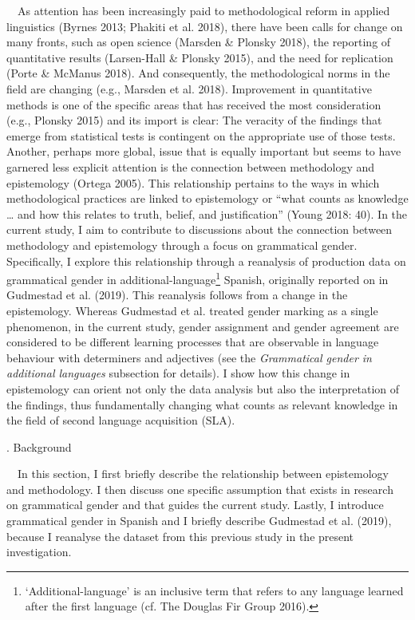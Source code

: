 \documentclass[12pt]{article}
\newenvironment{styleNoSpacing}{\setlength\leftskip{0cm}\setlength\rightskip{0cm plus 1fil}\setlength\parindent{0cm}\setlength\parfillskip{0pt plus 1fil}\setlength\parskip{0cm plus 1pt}\writerlistparindent\writerlistleftskip\leavevmode\normalfont\normalsize\fontsize{11pt}{13.2pt}\selectfont\writerlistlabel\ignorespaces}{\unskip\vspace{0cm plus 1pt}\par}
\newcommand\writerlistleftskip{}
\newcommand\writerlistparindent{}
\newcommand\writerlistlabel{}
\begin{document}
\begin{styleNoSpacing}
\ \ As attention has been increasingly paid to methodological reform in applied linguistics (Byrnes 2013; Phakiti et al. 2018), there have been calls for change on many fronts, such as open science (Marsden \& Plonsky 2018), the reporting of quantitative results (Larsen-Hall \& Plonsky 2015), and the need for replication (Porte \& McManus 2018). And consequently, the methodological norms in the field are changing (e.g., Marsden et al. 2018). Improvement in quantitative methods is one of the specific areas that has received the most consideration (e.g., Plonsky 2015) and its import is clear: The veracity of the findings that emerge from statistical tests is contingent on the appropriate use of those tests. Another, perhaps more global, issue that is equally important but seems to have garnered less explicit attention is the connection between methodology and epistemology (Ortega 2005). This relationship pertains to the ways in which methodological practices are linked to epistemology or “what counts as knowledge … and how this relates to truth, belief, and justification” (Young 2018: 40). In the current study, I aim to contribute to discussions about the connection between methodology and epistemology through a focus on grammatical gender. Specifically, I explore this relationship through a reanalysis of production data on grammatical gender in additional-language\footnote{\textrm{ ‘Additional-language’ is an inclusive term that refers to any language learned after the first language (cf. The Douglas Fir Group 2016).}} Spanish, originally reported on in Gudmestad et al. (2019). This reanalysis follows from a change in the epistemology. Whereas Gudmestad et al. treated gender marking as a single phenomenon, in the current study, gender assignment and gender agreement are considered to be different learning processes that are observable in language behaviour with determiners and adjectives (see the \textit{Grammatical gender in additional languages }subsection for details). I show how this change in epistemology can orient not only the data analysis but also the interpretation of the findings, thus fundamentally changing what counts as relevant knowledge in the field of second language acquisition (SLA). 
\end{styleNoSpacing}

\begin{styleNoSpacing}
2. Background
\end{styleNoSpacing}

\begin{styleNoSpacing}
\ \ In this section, I first briefly describe the relationship between epistemology and methodology. I then discuss one specific assumption that exists in research on grammatical gender and that guides the current study. Lastly, I introduce grammatical gender in Spanish and I briefly describe Gudmestad et al. (2019), because I reanalyse the dataset from this previous study in the present investigation.
\end{styleNoSpacing}
\end{document}
